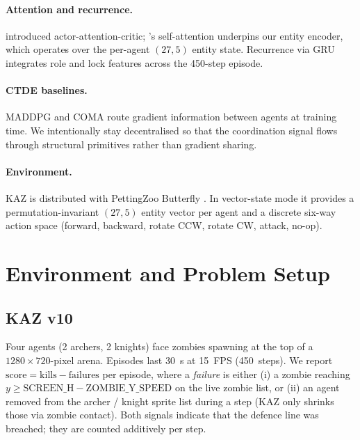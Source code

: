\documentclass[11pt,a4paper]{article}
\begin{document}
\paragraph{Attention and recurrence.} \citet{iqbal2019actor} introduced
actor-attention-critic; \citet{vaswani2017attention}'s self-attention
underpins our entity encoder, which operates over the per-agent
$(27, 5)$ entity state. Recurrence via GRU
\cite{cho2014learning, hausknecht2015deep} integrates role and lock
features across the 450-step episode.

\paragraph{CTDE baselines.} MADDPG \cite{lowe2017multi} and COMA
\cite{foerster2018counterfactual} route gradient information between
agents at training time. We intentionally stay decentralised so that
the coordination signal flows through structural primitives rather than
gradient sharing.

\paragraph{Environment.} KAZ is distributed with PettingZoo Butterfly
\cite{terry2021pettingzoo}. In vector-state mode it provides a
permutation-invariant $(27, 5)$ entity vector per agent and a discrete
six-way action space (forward, backward, rotate CCW, rotate CW, attack,
no-op).

\section{Environment and Problem Setup}
\label{sec:env}

\subsection{KAZ v10}

Four agents (2 archers, 2 knights) face zombies spawning at the top of a
$1280 \times 720$-pixel arena. Episodes last 30~s at 15~FPS (450~steps).
We report $\text{score} = \text{kills} - \text{failures}$ per episode,
where a \emph{failure} is either (i) a zombie reaching
$y \ge \text{SCREEN\_H} - \text{ZOMBIE\_Y\_SPEED}$ on the live zombie
list, or (ii) an agent removed from the archer / knight sprite list
during a step (KAZ only shrinks those via zombie contact). Both signals
indicate that the defence line was breached; they are counted additively
per step.
\end{document}
